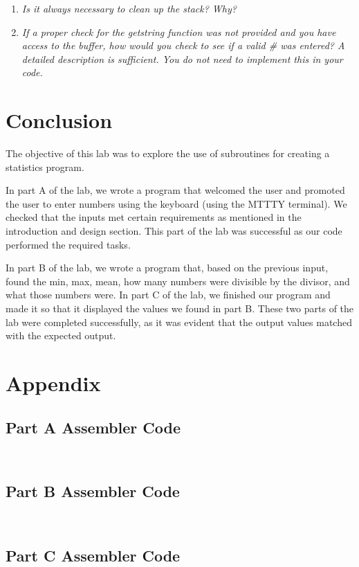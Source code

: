 \documentclass[10pt, letterpaper, titlepage]{article} %
\begin{document}
\begin{multicols*}{2}
\begin{enumerate}
\item \textit{Is it always necessary to clean up the stack? Why?}

\item \textit{If a proper check for the getstring function was not provided and you have access to the buffer, how would you check to see if a valid \# was entered? A detailed description is sufficient. You do not need to implement this in your code.}
\end{enumerate}

\section{Conclusion}
The objective of this lab was to explore the use of subroutines for creating a statistics program. 

In part A of the lab, we wrote a program that welcomed the user and promoted the user to enter numbers using the keyboard (using the MTTTY terminal). 
We checked that the inputs met certain requirements as mentioned in the introduction and design section. 
This part of the lab was successful as our code performed the required tasks.

In part B of the lab, we wrote a program that, based on the previous input, found the min, max, mean, how many numbers were divisible by the divisor, and what those numbers were. 
In part C of the lab, we finished our program and made it so that it displayed the values we found in part B. 
These two parts of the lab were completed successfully, as it was evident that the output values matched with the expected output. 


\end{multicols*}

\newpage

\section{Appendix}
\subsection{Part A Assembler Code}
\begin{lstlisting}
	
\end{lstlisting}

\subsection{Part B Assembler Code}
\begin{lstlisting}
	
\end{lstlisting}

\subsection{Part C Assembler Code}
\begin{lstlisting}
	
\end{lstlisting}
\end{document}
